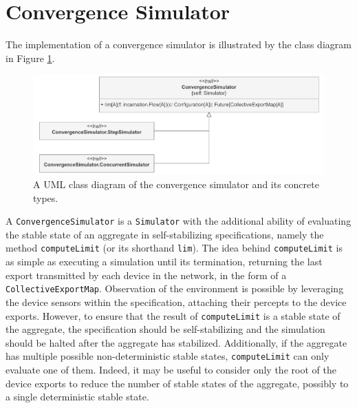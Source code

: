 
\section{Convergence Simulator}
\label{section:implementation:convergence-simulator}

The implementation of a convergence simulator is illustrated by the class
diagram in Figure \ref{figure:convergence-simulator-class-diagram}.

\begin{figure}[!ht]
  \centering
  \includegraphics[width=1\textwidth]{resources/figures/diagrams/short/convergence-simulator-class-diagram.pdf}
  \caption[A UML class diagram of the convergence simulator]{
    A UML class diagram of the convergence simulator
    and its concrete types.
  }
  \label{figure:convergence-simulator-class-diagram}
\end{figure}

A \texttt{ConvergenceSimulator} is a \texttt{Simulator} with the additional
ability of evaluating the stable state of an aggregate in self-stabilizing
specifications, namely the method \texttt{computeLimit} (or its shorthand
\texttt{lim}). The idea behind \texttt{computeLimit} is as simple as executing
a simulation until its termination, returning the last export transmitted by
each device in the network, in the form of a \texttt{CollectiveExportMap}.
Observation of the environment is possible by leveraging the device sensors
within the specification, attaching their percepts to the device exports.
However, to ensure that the result of \texttt{computeLimit} is a stable state
of the aggregate, the specification should be self-stabilizing and the
simulation should be halted after the aggregate has stabilized. Additionally,
if the aggregate has multiple possible non-deterministic stable states,
\texttt{computeLimit} can only evaluate one of them. Indeed, it may be useful
to consider only the root of the device exports to reduce the number of stable
states of the aggregate, possibly to a single deterministic stable state.

